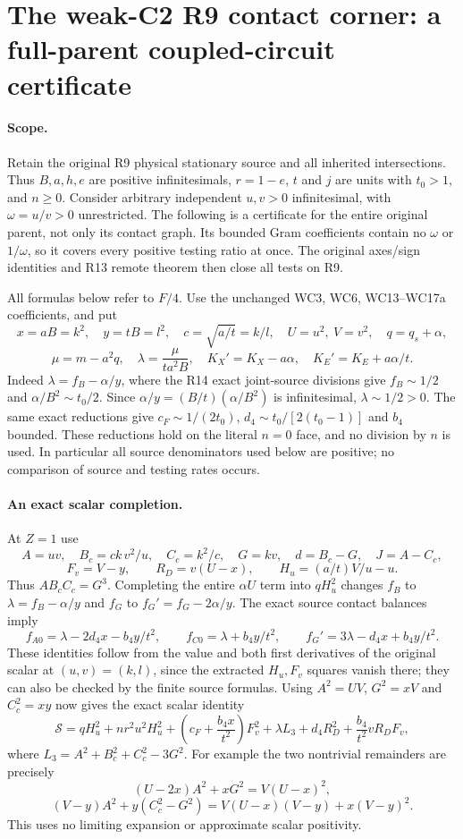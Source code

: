 \section{The weak-C2 R9 contact corner: a full-parent coupled-circuit certificate}

\paragraph{Scope.}
Retain the original R9 physical stationary source and all inherited
intersections. Thus $B,a,h,e$ are positive infinitesimals,
$r=1-e$, $t$ and $j$ are units with $t_0>1$, and $n\ge0$.
Consider arbitrary independent $u,v>0$ infinitesimal, with
$\omega=u/v>0$ unrestricted. The following is a certificate for the
entire original parent, not only its contact graph. Its bounded Gram
coefficients contain no $\omega$ or $1/\omega$, so it covers every
positive testing ratio at once. The original axes/sign identities and
R13 remote theorem then close all tests on R9.

All formulas below refer to $F/4$. Use the unchanged WC3, WC6,
WC13--WC17a coefficients, and put
\[
 x=aB=k^2,\quad y=tB=l^2,\quad c=\sqrt{a/t}=k/l,
 \quad U=u^2,\ V=v^2,\quad q=q_s+\alpha,
\]
\[
 \mu=m-a^2q,\quad \lambda=\frac{\mu}{ta^2B},\quad
 K_X'=K_X-a\alpha,\quad K_E'=K_E+a\alpha/t.
\]
Indeed $\lambda=f_B-\alpha/y$, where the R14 exact joint-source
divisions give $f_B\sim1/2$ and $\alpha/B^2\sim t_0/2$. Since
$\alpha/y=(B/t)(\alpha/B^2)$ is infinitesimal, $\lambda\sim1/2>0$.
The same exact reductions give
$c_F\sim1/(2t_0)$, $d_4\sim t_0/[2(t_0-1)]$ and $b_4$ bounded.
These reductions hold on the literal $n=0$ face, and no division by
$n$ is used. In particular all source denominators used below are positive; no
comparison of source and testing rates occurs.

\paragraph{An exact scalar completion.}
At $Z=1$ use
\[
 A=uv,\quad B_c=ck\,v^2/u,\quad C_c=k^2/c,
 \quad G=kv,\quad d=B_c-G,\quad J=A-C_c,
\]
\[
 F_v=V-y,\qquad R_D=v(U-x),\qquad H_u=(a/t)V/u-u.
\]
Thus $AB_cC_c=G^3$. Completing the entire $\alpha U$ term into
$qH_u^2$ changes $f_B$ to $\lambda=f_B-\alpha/y$ and $f_G$
to $f_G'=f_G-2\alpha/y$. The exact source contact balances imply
\[
 f_{A0}=\lambda-2d_4x-b_4y/t^2,\qquad
 f_{C0}=\lambda+b_4y/t^2,\qquad
 f_G'=3\lambda-d_4x+b_4y/t^2.
 \tag{RC1}
\]
These identities follow from the value and both first derivatives
of the original scalar at $(u,v)=(k,l)$, since the extracted
$H_u,F_v$ squares vanish there; they can also be checked by the
finite source formulas. Using $A^2=UV$, $G^2=xV$ and $C_c^2=xy$
now gives the exact scalar identity
\[
 \mathcal S=qH_u^2+nr^2u^2H_u^2+
 \left(c_F+\frac{b_4x}{t^2}\right)F_v^2
 +\lambda L_3+d_4R_D^2+\frac{b_4}{t^2}vR_DF_v,
 \tag{RC2}
\]
where $L_3=A^2+B_c^2+C_c^2-3G^2$.
For example the two nontrivial remainders are precisely
\[
 (U-2x)A^2+xG^2=V(U-x)^2,
\]
\[
 (V-y)A^2+y(C_c^2-G^2)
       =V(U-x)(V-y)+x(V-y)^2.
\]
This uses no limiting expansion or approximate scalar positivity.

